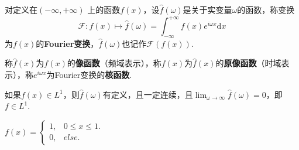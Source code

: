 \documentclass[openany,oneside]{ctexbook}
\begin{document}
\begin{definition}[Fourier变换]
    对定义在$(-\infty,+\infty)$ 上的函数$f(x)$，设$\hat{f}(\omega)$是关于实变量$\omega$的函数，称变换
    \begin{equation}\label{Fourier变换}
        \mathcal{F}:f(x)\mapsto\hat{f}(\omega)=\int_{-\infty}^{+\infty}f(x)e^{i\omega x}\mathrm{d}x
    \end{equation}
    为$f(x)$的\textbf{Fourier变换}，$\hat{f}(\omega)$也记作$\mathcal{F}(f(x))$.
\end{definition}
称$\hat{f}(x)$为$f(x)$的\textbf{像函数}（频域表示），称$f(x)$为$\hat{f}(x)$的\textbf{原像函数}（时域表示），称$e^{i\omega x}$为Fourier变换的\textbf{核函数}.
\par 如果$f(x)\in L^1$，则$\hat{f}(\omega)$有定义，且一定连续，且$\lim_{\omega\to\infty}\hat{f}(\omega)=0$，即$f\in L^1$.

\begin{example}
    $f(x)=
        \begin{cases}
            1, & 0\leq x\leq 1.\\
            0, & else.
        \end{cases}
    $
\end{example}
\end{document}
